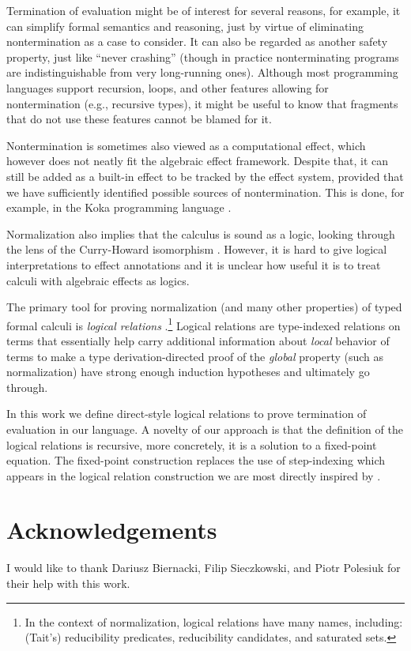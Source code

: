 \documentclass[a4paper, 11pt,titlepage, openright, twoside]{report}
\newcommand{\+}{\enspace}
\begin{document}
Termination of evaluation might be of interest for several reasons,
for example, it can simplify formal semantics and reasoning, just by virtue of
eliminating nontermination as a case to consider.
It can also be regarded as another safety property, just like ``never crashing''
(though in practice nonterminating programs are indistinguishable from {very long}-running ones).
Although most programming languages support recursion, loops, and other
features allowing for nontermination (e.g., recursive types),
it might be useful to know that fragments that do not use these features cannot be blamed
for it.

Nontermination is sometimes also viewed as a computational effect,
which however does not neatly fit the algebraic effect framework.
Despite that, it can still be added as a built-in effect to be tracked by
the effect system, provided that we have sufficiently identified possible sources
of nontermination.
This is done, for example, in the Koka programming language \cite{koka}.

Normalization also implies that the calculus is sound as a logic,
looking through the lens of the Curry-Howard isomorphism \cite{ch}.
However, it is hard to give logical interpretations to effect annotations \cite{oleg}
and it is unclear how useful it is to treat calculi with algebraic effects as logics.

The primary tool for proving normalization (and many other properties) of
typed formal calculi is {\em logical relations} \cite{lr}.\footnote{
	In the context of normalization, logical relations have many names, including:
	(Tait's) reducibility predicates, reducibility candidates, and saturated sets.
}
Logical relations are
type-indexed relations on terms that essentially help carry additional
information about {\em local} behavior of terms to make a type derivation-directed
proof of the {\em global} property (such as normalization)
have strong enough induction hypotheses and ultimately go through.

In this work we define direct-style logical relations
to prove termination
of evaluation in our language.
A novelty of our approach
is that the definition of the logical relations
is recursive, more concretely, it is a solution to a fixed-point equation.
The fixed-point construction replaces the use of step-indexing
which appears in the logical relation construction we are most directly inspired by \cite{hwc}.

\section{Acknowledgements}
I would like to thank Dariusz Biernacki, Filip Sieczkowski, and Piotr Polesiuk
for their help with this work.
\end{document}
